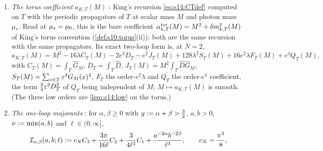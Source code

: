 \begin{enumerate}[label=\textup{(G\arabic*)},leftmargin=*]
\item \emph{The torus coefficient} $a_{K,T}(M)$ \cite[Def.~2.2]{SymPhase}: King's recursion \eqref{eq:s14:CTdef} computed on $T$ with the periodic propagators of $T$ at scalar mass $M$ and photon mass $\mu_*$. Read at $\mu_*=\mu_0$, this is the bare coefficient $\alpha^{\mathrm{tor}}_{k,T}(M)=M^2+\delta m^2_{k,T}(M)$ of King's torus convention (\cref{def:s10:torus}(ii)): both are the same recursion with the same propagators. Its exact two-loop form \cite[Lemma~G.1]{SymPhase} is, at $N=2$,
\[
a_{K,T}(M)=M^2-16\lambda C_T(M)-2e^2D_T-e^2J_T(M)+128\lambda^2S_T(M)+16e^2\lambda F_T(M)+e^4Q_T(M),
\]
with $C_T(M)=\int_T\hat G_M$, $D_T=\int_T\hat D$, $J_T(M)=M^2\int_T\hat D\hat G_M$, $S_T(M)=\sum_{x\in T}\varepsilon^3G_M(x)^3$, $F_T$ the order-$e^2\lambda$ and $Q_T$ the order-$e^4$ coefficient, the term $\frac34\varepsilon^2D_T^2$ of $Q_T$ being independent of $M$; $M\mapsto a_{K,T}(M)$ is smooth. (The three low orders are \cref{lem:s14:low} on the torus.)
\item \emph{The one-loop majorants} \cite[Lemma~G.15]{SymPhase}: for $\alpha,\beta\ge0$ with $g:=\alpha+\beta>\frac32$, $a,b>0$, $\nu:=\min(a,b)$ and $\ell\in(0,\infty]$,
\begin{equation}\label{eq:s14:Iab}
\mathcal I_{\alpha,\beta}(a,b;\ell):= c_NC_3+\frac{3\pi}{16\ell}C_2+\frac3{4\ell^2}C_1+\frac{a^{-2\alpha}b^{-2\beta}}{\ell^3},\qquad c_N=\frac{\pi^3}8,
\end{equation}

\end{enumerate}
